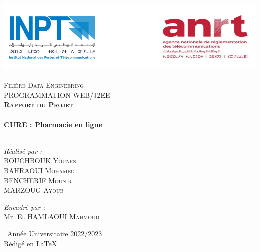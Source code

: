 \begin{titlepage}
\begin{center}

\includegraphics[width=1\textwidth]{./INPT+ANRT}~\\[1.5cm]

\textsc{\large Filière Data Engineering}\\[0.5cm]
\vbox{ }
\textsc{\Large PROGRAMMATION WEB/J2EE}\\[2.5cm]

\textsc{\Large \bfseries Rapport du Projet}\\[0.4cm]

\HRule \\[0.3cm]
\vspace{1cm}
{\huge \bfseries CURE : Pharmacie en ligne}\\[0.3cm]
\vspace{1cm}
\HRule \\[3cm]

\begin{minipage}{0.4\textwidth}
\begin{flushleft} \large
\emph{Réalisé par :}\\[0.5 cm]
BOUCHBOUK  \textsc{ Younes}\\
BAHRAOUI  \textsc{ Mohamed}\\
BENCHERIF  \textsc{ Mounir}\\
MARZOUG  \textsc{ Ayoub}\\

\end{flushleft}
\end{minipage}
\begin{minipage}{0.4\textwidth}
\begin{flushright} \large
\emph{Encadré par :} \\[0.5 cm]
Mr. E\textsc{l} HAMLAOUI\textsc{ Mahmoud}\\

\end{flushright}
\end{minipage}




\vfill


{\large \ Année Universitaire 2022/2023}
\vspace{.4cm}
{\large \\ Rédigé en \LaTeX}

\end{center}
\end{titlepage}